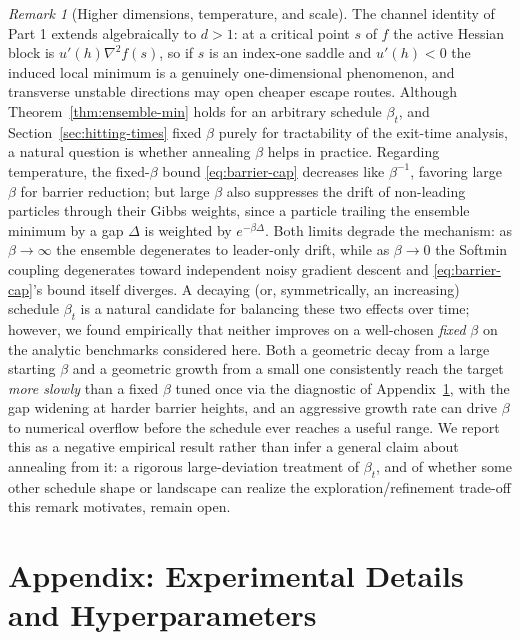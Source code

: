\documentclass{article} %
\theoremstyle{plain}
\theoremstyle{definition}
\theoremstyle{remark}
\newtheorem{remark}[theorem]{Remark}
\begin{document}
\begin{remark}[Higher dimensions, temperature, and scale]
\label{rem:higher-dim}
The channel identity of Part 1 extends algebraically to $d>1$: at a critical point $s$ of $f$ the active Hessian block is $u'(h)\nabla^2 f(s)$, so if $s$ is an index-one saddle and $u'(h)<0$ the induced local minimum is a genuinely one-dimensional phenomenon, and transverse unstable directions may open cheaper escape routes. Although Theorem~\ref{thm:ensemble-min} holds for an arbitrary schedule $\beta_t$, and Section~\ref{sec:hitting-times} fixed $\beta$ purely for tractability of the exit-time analysis, a natural question is whether annealing $\beta$ helps in practice. Regarding temperature, the fixed-$\beta$ bound \eqref{eq:barrier-cap} decreases like $\beta^{-1}$, favoring large $\beta$ for barrier reduction; but large $\beta$ also suppresses the drift of non-leading particles through their Gibbs weights, since a particle trailing the ensemble minimum by a gap $\Delta$ is weighted by $e^{-\beta\Delta}$. Both limits degrade the mechanism: as $\beta\to\infty$ the ensemble degenerates to leader-only drift, while as $\beta\to0$ the Softmin coupling degenerates toward independent noisy gradient descent and \eqref{eq:barrier-cap}'s bound itself diverges. A decaying (or, symmetrically, an increasing) schedule $\beta_t$ is a natural candidate for balancing these two effects over time; however, we found empirically that neither improves on a well-chosen \emph{fixed} $\beta$ on the analytic benchmarks considered here. Both a geometric decay from a large starting $\beta$ and a geometric growth from a small one consistently reach the target \emph{more slowly} than a fixed $\beta$ tuned once via the diagnostic of Appendix~\ref{app:hyperparameters}, with the gap widening at harder barrier heights, and an aggressive growth rate can drive $\beta$ to numerical overflow before the schedule ever reaches a useful range. We report this as a negative empirical result rather than infer a general claim about annealing from it: a rigorous large-deviation treatment of $\beta_t$, and of whether some other schedule shape or landscape can realize the exploration/refinement trade-off this remark motivates, remain open.
\end{remark}

\section{Appendix: Experimental Details and Hyperparameters}
\label{app:hyperparameters}
\end{document}
